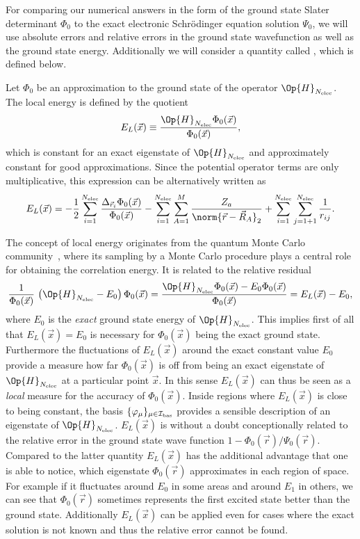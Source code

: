 For comparing our numerical answers in the form of the \HF
ground state Slater determinant $\Phi_0$
to the exact electronic Schrödinger equation solution $\Psi_0$,
we will use absolute errors and relative errors in the ground state wavefunction
as well as the ground state energy.
Additionally we will consider a quantity called ,
which is defined below.
\begin{defn}
	Let $\Phi_0$ be an approximation to the ground state
	of the operator $\Op{H}_{\Nelec}$.
	The local energy is defined by the quotient
	\begin{equation}
		E_L(\vec{x}) \equiv \frac{\Op{H}_{\Nelec} \Phi_0(\vec{x})}{\Phi_0(\vec{x})},
		\label{eqn:LocalEnergy}
	\end{equation}
	which is constant for an exact eigenstate of $\Op{H}_{\Nelec}$
	and approximately constant for good approximations.
	Since the potential operator terms are only multiplicative,
	this expression can be alternatively written as
	\[
		E_L(\vec{x})
		= -\frac12 \sum_{i=1}^{\Nelec} \frac{\Delta_{\vec{r}_i} \Phi_0(\vec{x})}{\Phi_0(\vec{x})}
		- \sum_{i=1}^{\Nelec} \sum_{A=1}^M \frac{Z_a}{\norm{\vec{r} - \vec{R}_A}_2}
		+ \sum_{i=1}^{\Nelec} \sum_{j=1+1}^{\Nelec} \frac{1}{r_{ij}}.
	\]
\end{defn}
The concept of local energy originates from the
quantum Monte Carlo community~\cite{Foulkes2001,Ma2005},
where its sampling by a Monte Carlo procedure plays a central role
for obtaining the correlation energy.
It is related to the relative residual
\[
	\frac{1}{\Phi_0(\vec{x})} \, \left(\Op{H}_{\Nelec} - E_0\right) \Phi_0(\vec{x}) =
	\frac{\Op{H}_{\Nelec} \Phi_0(\vec{x}) - E_0 \Phi_0(\vec{x})}{\Phi_0(\vec{x})}
	= E_L(\vec{x}) - E_0,
\]
where $E_0$ is the \emph{exact} ground state energy of $\Op{H}_{\Nelec}$.
This implies first of all
that $E_L(\vec{x}) = E_0$ is necessary for $\Phi_0(\vec{x})$ being the exact ground state.
Furthermore the fluctuations of $E_L(\vec{x})$ around the exact constant value $E_0$
provide a measure how far $\Phi_0(\vec{x})$ is off from being an
exact eigenstate of $\Op{H}_{\Nelec}$ at a particular point $\vec{x}$.
In this sense $E_L(\vec{x})$ can thus be seen as a \emph{local} measure
for the accuracy of $\Phi_0(\vec{x})$.
Inside regions where $E_L(\vec{x})$ is close to being constant,
the basis $\{\varphi_\mu\}_{\mu\in\mathcal{I}_\text{bas}}$ provides a sensible description
of an eigenstate of $\Op{H}_{\Nelec}$.
$E_L(\vec{x})$ is without a doubt conceptionally related to the
relative error in the ground state wave function $1 - \Phi_0(\vec{r}) / \Psi_0(\vec{r})$.
Compared to the latter quantity $E_L(\vec{x})$
has the additional advantage that one is able to notice,
which eigenstate $\Phi_0(\vec{r})$ approximates in each region of space.
For example if it fluctuates around $E_0$ in some areas and around $E_1$ in others,
we can see that $\Phi_0(\vec{r})$ sometimes represents the first excited state
better than the ground state.
Additionally $E_L(\vec{x})$ can be applied even for cases where
the exact solution is not known and thus the relative error cannot be found.

